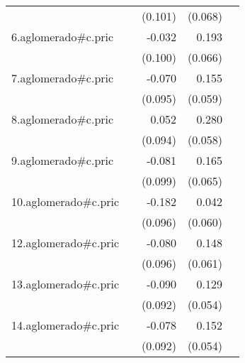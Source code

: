 {\begin{longtable}{l*{4}{D{.}{.}{-1}}}
            &                     &     (0.101)         &     (0.068)         &                     \\
\addlinespace
6.aglomerado#c.pric&                     &      -0.032         &       0.193\sym{**} &                     \\
            &                     &     (0.100)         &     (0.066)         &                     \\
\addlinespace
7.aglomerado#c.pric&                     &      -0.070         &       0.155\sym{**} &                     \\
            &                     &     (0.095)         &     (0.059)         &                     \\
\addlinespace
8.aglomerado#c.pric&                     &       0.052         &       0.280\sym{***}&                     \\
            &                     &     (0.094)         &     (0.058)         &                     \\
\addlinespace
9.aglomerado#c.pric&                     &      -0.081         &       0.165\sym{*}  &                     \\
            &                     &     (0.099)         &     (0.065)         &                     \\
\addlinespace
10.aglomerado#c.pric&                     &      -0.182         &       0.042         &                     \\
            &                     &     (0.096)         &     (0.060)         &                     \\
\addlinespace
12.aglomerado#c.pric&                     &      -0.080         &       0.148\sym{*}  &                     \\
            &                     &     (0.096)         &     (0.061)         &                     \\
\addlinespace
13.aglomerado#c.pric&                     &      -0.090         &       0.129\sym{*}  &                     \\
            &                     &     (0.092)         &     (0.054)         &                     \\
\addlinespace
14.aglomerado#c.pric&                     &      -0.078         &       0.152\sym{**} &                     \\
            &                     &     (0.092)         &     (0.054)         &                     \\

\end{longtable}}
